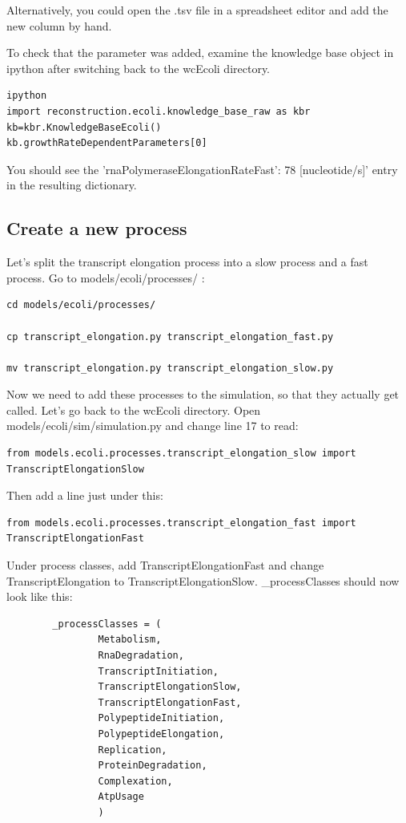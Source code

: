 \documentclass[12pt]{article}
\begin{document}
Alternatively, you could open the .tsv file in a spreadsheet editor and add the new column by hand.

To check that the parameter was added, examine the knowledge base object in ipython after switching back to the wcEcoli directory.

\lstset{language=Python}
\begin{lstlisting}
ipython
import reconstruction.ecoli.knowledge_base_raw as kbr
kb=kbr.KnowledgeBaseEcoli()
kb.growthRateDependentParameters[0]
\end{lstlisting}

You should see the 'rnaPolymeraseElongationRateFast': 78 [nucleotide/s]' entry in the resulting dictionary.

\subsection{Create a new process}

Let’s split the transcript elongation process into a slow process and a fast process. Go to models/ecoli/processes/ :

\lstset{language=bash}
\begin{lstlisting}
cd models/ecoli/processes/

cp transcript_elongation.py transcript_elongation_fast.py

mv transcript_elongation.py transcript_elongation_slow.py
\end{lstlisting}

Now we need to add these processes to the simulation, so that they actually get called. Let’s go back to the wcEcoli directory. Open models/ecoli/sim/simulation.py and change line 17
to read: 

\lstset{language=Python}
\begin{lstlisting}
from models.ecoli.processes.transcript_elongation_slow import TranscriptElongationSlow
\end{lstlisting}

Then add a line just under this:

\begin{lstlisting}
from models.ecoli.processes.transcript_elongation_fast import TranscriptElongationFast
\end{lstlisting}

Under process classes, add TranscriptElongationFast and change TranscriptElongation to TranscriptElongationSlow. \_processClasses should now look like this:


\begin{lstlisting}
        _processClasses = (
                Metabolism,
                RnaDegradation,
                TranscriptInitiation,
                TranscriptElongationSlow,
                TranscriptElongationFast,
                PolypeptideInitiation,
                PolypeptideElongation,
                Replication,
                ProteinDegradation,
                Complexation,
                AtpUsage
                )
\end{lstlisting}
\end{document}

